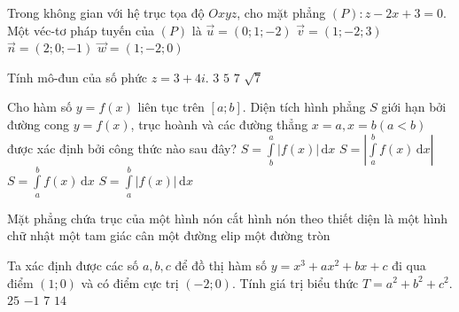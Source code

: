 \begin{ex}%
Trong không gian với hệ trục tọa độ $Oxyz$, cho mặt phẳng $(P) \colon z - 2x + 3 = 0$. Một véc-tơ pháp tuyến của $(P)$ là
\choice
{$\vec{u} = (0;1;-2)$}
{$\vec{v}= (1;-2;3)$}
{\True $\vec{n} = (2;0;-1)$}
{$\vec{w} = (1;-2;0)$}
\end{ex}

\begin{ex}%
Tính mô-đun của số phức $z=3+4i$.
\choice
{$3$}
{\True $5$}
{$7$}
{$\sqrt{7}$}
\end{ex}

\begin{ex}%
Cho hàm số $y = f(x)$ liên tục trên $\left[ a; b \right]$. Diện tích hình phẳng $S$ giới hạn bởi đường cong $y = f(x)$, trục hoành và các đường thẳng $x = a, x = b (a<b)$ được xác định bởi công thức nào sau đây?
\choice
{$\displaystyle S = \int \limits_b^a \left| f(x) \right| \mathrm{\,d}x$}
{$\displaystyle S = \left| \int \limits_a^b f(x) \mathrm{\,d} x \right|$}
{$\displaystyle S = \int \limits^b_a f(x) \mathrm{\,d}x$}
{\True $\displaystyle S = \int \limits_a^b \left| f(x) \right| \mathrm{\,d}x$}
\end{ex}

\begin{ex}%
Mặt phẳng chứa trục của một hình nón cắt hình nón theo thiết diện là
\choice
{một hình chữ nhật}
{\True một tam giác cân}
{một đường elip}
{một đường tròn}
\end{ex}

\begin{ex}%
Ta xác định được các số $a,b,c$ để đồ thị hàm số $y=x^3 +ax^2 +bx + c$ đi qua điểm $(1;0)$ và có điểm cực trị $(-2;0)$. Tính giá trị biểu thức $T = a^2 + b^2 + c^2$.
\choice
{\True $25$}
{$-1$}
{$7$}
{$14$}
\end{ex}

